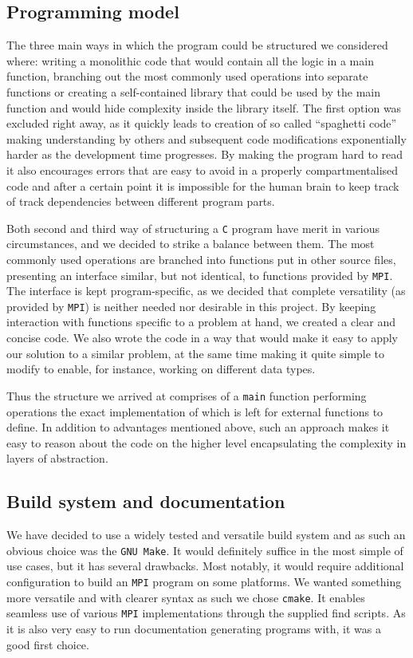 \documentclass[11pt,a4paper]{article}
\begin{document}
\subsection{Programming model}
\label{sec:model}
The three main ways in which the program could be structured we considered where: writing a monolithic code that would contain all the logic in a main function, branching out the most commonly used operations into separate functions or creating a self-contained library that could be used by the main function and would hide complexity inside the library itself.
The first option was excluded right away, as it quickly leads to creation of so called ``spaghetti code'' making understanding by others and subsequent code modifications exponentially harder as the development time progresses. 
By making the program hard to read it also encourages errors that are easy to avoid in a properly compartmentalised code and after a certain point it is impossible for the human brain to keep track of track dependencies between different program parts.

Both second and third way of structuring a \texttt{C} program have merit in various circumstances, and we decided to strike a balance between them. 
The most commonly used operations are branched into functions put in other source files, presenting an interface similar, but not identical, to functions provided by \texttt{MPI}.
The interface is kept program-specific, as we decided that complete versatility (as provided by \texttt{MPI}) is neither needed nor desirable in this project. 
By keeping interaction with functions specific to a problem at hand, we created a clear and concise code.
We also wrote the code in a way that would make it easy to apply our solution to a similar problem, at the same time making it quite simple to modify to enable, for instance, working on different data types.

Thus the structure we arrived at comprises of a \texttt{main} function performing operations the exact implementation of which is left for external functions to define. 
In addition to advantages mentioned above, such an approach makes it easy to reason about the code on the higher level encapsulating the complexity in layers of abstraction.

\subsection{Build system and documentation}
We have decided to use a widely tested and versatile build system and as such an obvious choice was the \texttt{GNU Make}. 
It would definitely suffice in the most simple of use cases, but it has several drawbacks. 
Most notably, it would require additional configuration to build an \texttt{MPI} program on some platforms. 
We wanted something more versatile and with clearer syntax as such we chose \texttt{cmake}. 
It enables seamless use of various \texttt{MPI} implementations through the supplied find scripts. 
As it is also very easy to run documentation generating programs with, it was a good first choice.
\end{document}
